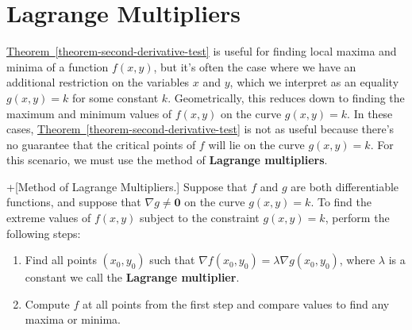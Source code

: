 \documentclass[10pt,]{book}
\newcommand{\terminology}[1]{\textbf{#1}}
\theoremstyle{ptxplainnotitle}
\theoremstyle{ptxplaintitle}
\theoremstyle{ptxplainnotitle}
\theoremstyle{ptxplaintitle}
\theoremstyle{ptxplainnotitle}
\theoremstyle{ptxplaintitle}
\theoremstyle{ptxdefinitionnotitle}
\theoremstyle{ptxdefinitiontitle}
\theoremstyle{ptxdefinitionnotitle}
\theoremstyle{ptxdefinitiontitle}
\theoremstyle{ptxdefinitionnotitle}
\theoremstyle{ptxdefinitiontitle}
\theoremstyle{ptxdefinitionnotitle}
\theoremstyle{ptxdefinitiontitle}
\theoremstyle{ptxdefinitionnotitle}
\theoremstyle{ptxdefinitiontitle}
\numberwithin{equation}{section}
\newcommand{\vv}[1]{\mathbf{#1}}
\newcommand{\grad}{\nabla}
\begin{document}
\section[{Lagrange Multipliers}]{Lagrange Multipliers}\label{section-lagrange-multipliers}
\hypertarget{p-1097}{}%
\hyperref[theorem-second-derivative-test]{Theorem~\ref{theorem-second-derivative-test}} is useful for finding local maxima and minima of a function \(f(x,y)\), but it's often the case where we have an additional restriction on the variables \(x\) and \(y\), which we interpret as an equality \(g(x,y) = k\) for some constant \(k\). Geometrically, this reduces down to finding the maximum and minimum values of \(f(x,y)\) on the curve \(g(x,y) = k\). In these cases, \hyperref[theorem-second-derivative-test]{Theorem~\ref{theorem-second-derivative-test}} is not as useful because there's no guarantee that the critical points of \(f\) will lie on the curve \(g(x,y) = k\). For this scenario, we must use the method of \terminology{Lagrange multipliers}.%
\begin{algorithm}+[{Method of Lagrange Multipliers.}]\label{algorithm-method-of-lagrange-multipliers}
\hypertarget{p-1098}{}%
Suppose that \(f\) and \(g\) are both differentiable functions, and suppose that \(\grad g\neq\vv{0}\) on the curve \(g(x,y) = k\). To find the extreme values of \(f(x,y)\) subject to the constraint \(g(x,y) = k\), perform the following steps: \leavevmode%
\begin{enumerate}
\item\hypertarget{li-83}{}Find all points \((x_{0},y_{0})\) such that \(\grad f(x_{0},y_{0}) = \lambda \grad g(x_{0},y_{0})\), where \(\lambda\) is a constant we call the \terminology{Lagrange multiplier}.%
\item\hypertarget{li-84}{}Compute \(f\) at all points from the first step and compare values to find any maxima or minima.%
\end{enumerate}
%
\end{algorithm}
\end{document}
